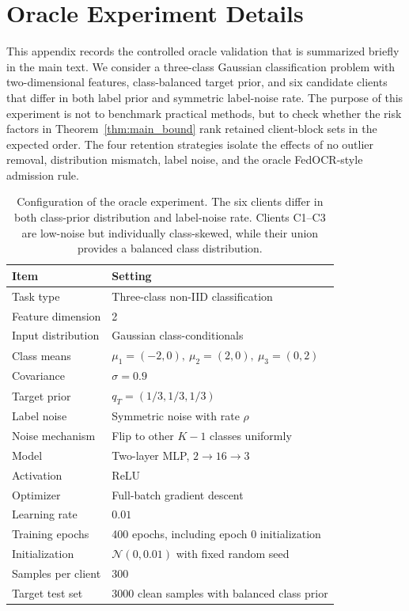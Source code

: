 \section{Oracle Experiment Details}
\label{app:oracle_experiment_details}
This appendix records the controlled oracle validation that is summarized briefly in the main text.
We consider a three-class Gaussian classification problem with two-dimensional features, class-balanced target prior, and six candidate clients that differ in both label prior and symmetric label-noise rate.
The purpose of this experiment is not to benchmark practical methods, but to check whether the risk factors in Theorem~\ref{thm:main_bound} rank retained client-block sets in the expected order.
The four retention strategies isolate the effects of no outlier removal, distribution mismatch, label noise, and the oracle FedOCR-style admission rule.
\begin{table}[t]
\centering
\caption{\normalfont Configuration of the oracle experiment. The six clients differ in both class-prior distribution and label-noise rate. Clients C1--C3 are low-noise but individually class-skewed, while their union provides a balanced class distribution.}
\label{tab:oracle_setup_appendix}
\setlength{\tabcolsep}{4pt}
\renewcommand{\arraystretch}{1.15}
\begin{tabular}{l|l}
\toprule
\textbf{Item} & \textbf{Setting} \\
\midrule
Task type & Three-class non-IID classification \\
Feature dimension & 2 \\
Input distribution & Gaussian class-conditionals \\
Class means & $\mu_1=(-2,0),\ \mu_2=(2,0),\ \mu_3=(0,2)$ \\
Covariance & $\sigma=0.9$ \\
Target prior & $q_T=(1/3,1/3,1/3)$ \\
Label noise & Symmetric noise with rate $\rho$ \\
Noise mechanism & Flip to other $K-1$ classes uniformly \\
Model & Two-layer MLP, $2 \rightarrow 16 \rightarrow 3$ \\
Activation & ReLU \\
Optimizer & Full-batch gradient descent \\
Learning rate & $0.01$ \\
Training epochs & 400 epochs, including epoch 0 initialization \\
Initialization & $\mathcal{N}(0,0.01)$ with fixed random seed \\
Samples per client & 300 \\
Target test set & 3000 clean samples with balanced class prior \\
\bottomrule
\end{tabular}
\end{table}

